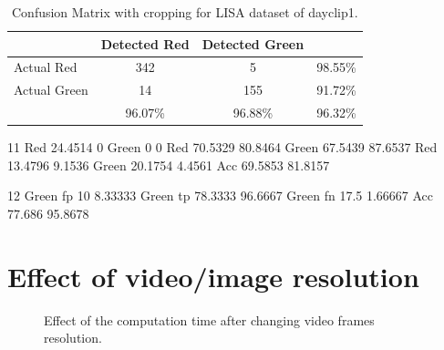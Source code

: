 \begin{table}[h!]
  \centering
  \caption{Confusion Matrix with cropping for LISA dataset of dayclip1.}
  \label{t:con_crp}
  \begin{tabular}{  l | c | c | r }
   
     & Detected Red & Detected Green &  \\
    \hline
    Actual Red & 342 & 5 & 98.55\% \\
    \hline
    Actual Green & 14 & 155 & 91.72\% \\
    \hline
    & 96.07\% & 96.88\% & 96.32\% \\
    
  \end{tabular}
\end{table}
11
Red 24.4514 0
Green 0 0
Red 70.5329 80.8464
Green 67.5439 87.6537
Red 13.4796 9.1536
Green 20.1754 4.4561
Acc 69.5853 81.8157

12
Green fp 10 8.33333
Green tp 78.3333 96.6667
Green fn 17.5 1.66667
Acc 77.686 95.8678


\section{Effect of video/image resolution}


\begin{figure}[h!]
  \centering
  \vspace{2in}
  \caption{Effect of the computation time after changing video frames resolution.}
  \label{f:vf_res}
\end{figure}


